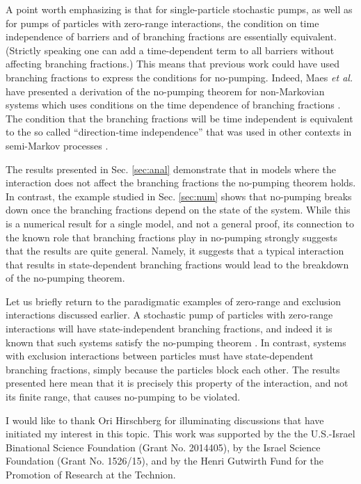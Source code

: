 \documentclass[aps,pre,showpacs,amsmath,amssymb,amsfonts,superscriptaddress,onecolumn,longbibliography]{revtex4-1}
\begin{document}
A point worth emphasizing is that for single-particle stochastic pumps, as well as for pumps of particles with zero-range interactions, the
condition on time independence of barriers and of branching fractions are essentially equivalent. (Strictly speaking one can
add a time-dependent term to all barriers without affecting branching fractions.)
This means that previous work could have used branching fractions
to express the conditions for no-pumping. Indeed,
Maes {\it et al.} have presented a derivation
of the no-pumping theorem for non-Markovian systems which uses conditions on the time dependence of branching fractions \cite{maes_general_2010}.
The condition that the branching fractions will be time independent is equivalent to the so called
``direction-time independence'' that was used in other contexts in semi-Markov processes \cite{Qian2006,Andrieux2008}.


The results presented in Sec. \ref{sec:anal} demonstrate that in models where the interaction does not affect the branching fractions
the no-pumping theorem holds. In contrast, the example studied in Sec. \ref{sec:num} shows that no-pumping breaks down once the branching
fractions depend on the state of the system. While this is a numerical result for a single model, and not a general proof, its connection to
the known role that branching fractions play in no-pumping strongly suggests that the results are quite general. Namely, it suggests that a typical
interaction that results in state-dependent branching fractions would lead to the breakdown of the no-pumping theorem.

Let us briefly return to the paradigmatic examples of zero-range and exclusion interactions discussed earlier. A stochastic pump
of particles with zero-range interactions will have state-independent branching fractions, and indeed it is known that such systems
satisfy the no-pumping theorem \cite{asban_no-pumping_2014}. In contrast, systems with exclusion interactions between particles must have
state-dependent branching fractions, simply because the particles block each other. The results presented here mean that it is precisely this
property of the interaction, and not its finite range, that causes no-pumping to be violated.

\begin{acknowledgments}
I would like to thank Ori Hirschberg for illuminating discussions that have
initiated my interest in this topic.
This work was supported by the the U.S.-Israel Binational Science
Foundation (Grant No. 2014405), by the Israel Science Foundation (Grant
No. 1526/15), and by the Henri Gutwirth Fund for the Promotion of
Research at the Technion.
\end{acknowledgments}
\end{document}
